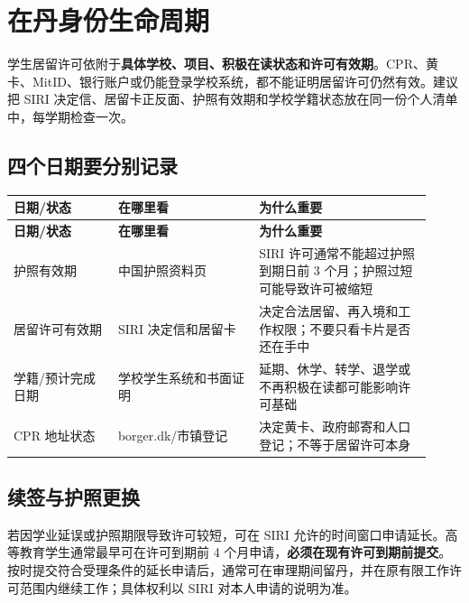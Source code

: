 
\section{在丹身份生命周期}\label{sec:residence-lifecycle}

学生居留许可依附于\textbf{具体学校、项目、积极在读状态和许可有效期}。CPR、黄卡、MitID、银行账户或仍能登录学校系统，都不能证明居留许可仍然有效。建议把 SIRI 决定信、居留卡正反面、护照有效期和学校学籍状态放在同一份个人清单中，每学期检查一次。

\subsection{四个日期要分别记录}

\small
{}
\begin{longtable}{p{0.23\linewidth}p{0.31\linewidth}p{0.38\linewidth}}
  \toprule
  \textbf{日期/状态} & \textbf{在哪里看} & \textbf{为什么重要} \\
  \midrule
  \endfirsthead
  \toprule
  \textbf{日期/状态} & \textbf{在哪里看} & \textbf{为什么重要} \\
  \midrule
  \endhead
  \bottomrule
  \endfoot
  护照有效期 & 中国护照资料页 & SIRI 许可通常不能超过护照到期日前 3 个月；护照过短可能导致许可被缩短 \\
  居留许可有效期 & SIRI 决定信和居留卡 & 决定合法居留、再入境和工作权限；不要只看卡片是否还在手中 \\
  学籍/预计完成日期 & 学校学生系统和书面证明 & 延期、休学、转学、退学或不再积极在读都可能影响许可基础 \\
  CPR 地址状态 & borger.dk/市镇登记 & 决定黄卡、政府邮寄和人口登记；不等于居留许可本身 \\
\end{longtable}
\normalsize

\subsection{续签与护照更换}

若因学业延误或护照期限导致许可较短，可在 SIRI 允许的时间窗口申请延长。高等教育学生通常最早可在许可到期前 4 个月申请，\textbf{必须在现有许可到期前提交}。按时提交符合受理条件的延长申请后，通常可在审理期间留丹，并在原有限工作许可范围内继续工作；具体权利以 SIRI 对本人申请的说明为准。

